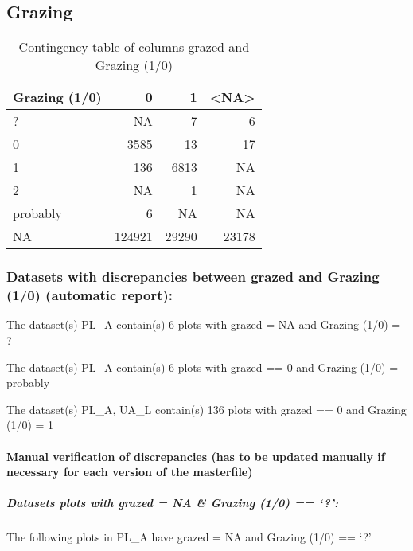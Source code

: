 \documentclass[table]{article}
\let\oldparagraph\paragraph
\renewcommand{\paragraph}[1]{\oldparagraph{#1}\mbox{}}
\let\oldsubparagraph\subparagraph
\renewcommand{\subparagraph}[1]{\oldsubparagraph{#1}\mbox{}}
\begin{document}
\subsection{Grazing}\label{grazing}

\begin{table}[H]

\caption{\label{tab:unnamed-chunk-22}Contingency table of columns grazed and Grazing (1/0)}
\centering
\begin{tabular}[t]{l|r|r|r}
\hline
Grazing (1/0) & 0 & 1 & <NA>\\
\hline
? & NA & 7 & 6\\
\hline
0 & 3585 & 13 & 17\\
\hline
1 & 136 & 6813 & NA\\
\hline
2 & NA & 1 & NA\\
\hline
probably & 6 & NA & NA\\
\hline
NA & 124921 & 29290 & 23178\\
\hline
\end{tabular}
\end{table}

\subsubsection{Datasets with discrepancies between grazed and Grazing
(1/0) (automatic
report):}\label{datasets-with-discrepancies-between-grazed-and-grazing-10-automatic-report}

The dataset(s) PL\_A contain(s) 6 plots with grazed = NA and Grazing
(1/0) = ?

The dataset(s) PL\_A contain(s) 6 plots with grazed == 0 and Grazing
(1/0) = probably

The dataset(s) PL\_A, UA\_L contain(s) 136 plots with grazed == 0 and
Grazing (1/0) = 1

\paragraph{Manual verification of discrepancies (has to be updated
manually if necessary for each version of the
masterfile)}\label{manual-verification-of-discrepancies-has-to-be-updated-manually-if-necessary-for-each-version-of-the-masterfile-1}

\subparagraph{\texorpdfstring{\emph{Datasets plots with grazed = NA \&
Grazing (1/0) ==
`?':}}{Datasets plots with grazed = NA \& Grazing (1/0) == ?:}}\label{datasets-plots-with-grazed-na-grazing-10}

The following plots in PL\_A have grazed = NA and Grazing (1/0) == `?'
\end{document}
